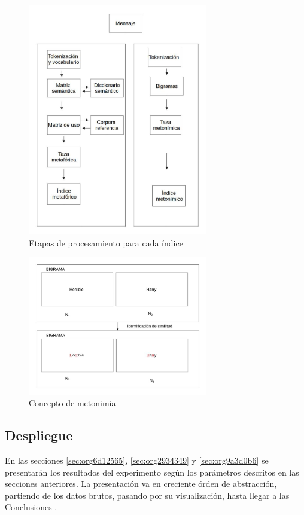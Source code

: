 \documentclass[12pt,letterpaper,twoside]{article}
\begin{document}
\begin{figure}[H]
\centering
\includegraphics[width=0.7\textwidth]{./assets/metodologia.jpg}
\caption{\label{fig:metodologia}Etapas de procesamiento para cada índice}
\end{figure}

\begin{figure}[H]
\centering
\includegraphics[width=0.7\textwidth]{./assets/metonimia.jpg}
\caption{\label{fig:metonimia}Concepto de metonimia}
\end{figure}

\subsection{Despliegue}
\label{sec:orgc4ff552}
En las secciones \ref{sec:org6d12565}, \ref{sec:org2934349} y
\ref{sec:org9a3d0b6} se presentarán los resultados del experimento
según los parámetros descritos en las secciones anteriores.
La presentación va en creciente órden de abstracción, partiendo
de los datos brutos, pasando por su visualización, hasta llegar
a las Conclusiones .
\end{document}
